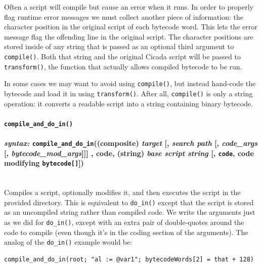 \documentclass{article}
\newenvironment{code}{
       \begin{list}{}{
               \setlength{\leftmargin}{.4in}
               \setlength{\rightmargin}{0in}
               \setlength{\topsep}{.2in}
       }
       \small
       \item[] }
       { \end{list}   }
\begin{document}
Often a script will compile but cause an error when it runs.  In order to properly flag runtime error messages we must collect another piece of information:  the character position in the original script of each bytecode word.  This lets the error message flag the offending line in the original script.  The character positions are stored inside of any string that is passed as an optional third argument to \texttt{compile()}.  Both that string and the original Cicada script will be passed to \verb#transform()#, the function that actually allows compiled bytecode to be run.

In some cases we may want to avoid using \verb#compile()#, but instead hand-code the bytecode and load it in using \verb#transform()#.  After all, \texttt{compile()} is only a string operation:  it converts a readable script into a string containing binary bytecode.\\

 
 
 

\paragraph{\texttt{compile\_and\_do\_in()}\\\\
\normalfont \emph{syntax: } \texttt{compile\_and\_do\_in}((composite) \emph{target} [, \emph{search path} [, \emph{code\_args} [, \emph{bytecode\_mod\_args}]]] , code, (string) \emph{base script string} [, \texttt{code}, code modifying \texttt{bytecode[]}])\\\\}

Compiles a script, optionally modifies it, and then executes the script in the provided directory.  This is equivalent to \verb#do_in()# except that the script is stored as an uncompiled string rather than compiled code.  We write the arguments just as we did for \verb#do_in()#, except with an extra pair of double-quotes around the code to compile (even though it's in the coding section of the arguments).  The analog of the \verb#do_in()# example would be:


\begin{code} \begin{verbatim}
compile_and_do_in(root; "al := @var1"; bytecodeWords[2] = that + 128)
\end{verbatim} \end{code}
\end{document}
